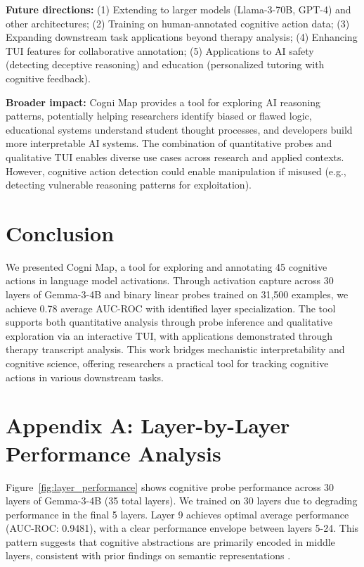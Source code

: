 \documentclass[letterpaper]{article}
\begin{document}
\textbf{Future directions:} (1) Extending to larger models (Llama-3-70B, GPT-4) and other architectures; (2) Training on human-annotated cognitive action data; (3) Expanding downstream task applications beyond therapy analysis; (4) Enhancing TUI features for collaborative annotation; (5) Applications to AI safety (detecting deceptive reasoning) and education (personalized tutoring with cognitive feedback).

\textbf{Broader impact:} Cogni Map provides a tool for exploring AI reasoning patterns, potentially helping researchers identify biased or flawed logic, educational systems understand student thought processes, and developers build more interpretable AI systems. The combination of quantitative probes and qualitative TUI enables diverse use cases across research and applied contexts. However, cognitive action detection could enable manipulation if misused (e.g., detecting vulnerable reasoning patterns for exploitation).

\section{Conclusion}

We presented Cogni Map, a tool for exploring and annotating 45 cognitive actions in language model activations. Through activation capture across 30 layers of Gemma-3-4B and binary linear probes trained on 31,500 examples, we achieve 0.78 average AUC-ROC with identified layer specialization. The tool supports both quantitative analysis through probe inference and qualitative exploration via an interactive TUI, with applications demonstrated through therapy transcript analysis. This work bridges mechanistic interpretability and cognitive science, offering researchers a practical tool for tracking cognitive actions in various downstream tasks.



\appendix

\section{Appendix A: Layer-by-Layer Performance Analysis}

Figure~\ref{fig:layer_performance} shows cognitive probe performance across 30 layers of Gemma-3-4B (35 total layers). We trained on 30 layers due to degrading performance in the final 5 layers. Layer 9 achieves optimal average performance (AUC-ROC: 0.9481), with a clear performance envelope between layers 5-24. This pattern suggests that cognitive abstractions are primarily encoded in middle layers, consistent with prior findings on semantic representations \cite{alain2016understanding}.
\end{document}
